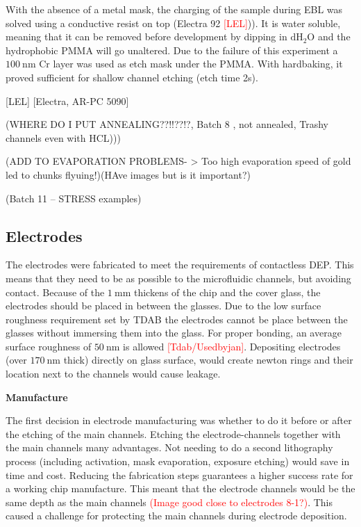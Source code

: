 \documentclass[draft]{jyflluk}
\begin{document}
With the absence of a metal mask, the charging of the sample during EBL was solved using a conductive resist on top (Electra 92 \textcolor{red}{[LEL]})). It is water soluble, meaning that it can be removed before development by dipping in $\mathrm{dH_2O}$ and the hydrophobic PMMA will go unaltered. 
Due to the failure of this experiment a $\SI{100}{\nano \metre}$ Cr layer was used as etch mask under the PMMA. With hardbaking, it proved sufficient for shallow channel etching (etch time 2s).


[LEL] [Electra, AR-PC 5090]

(WHERE DO I PUT ANNEALING??!!??!?,  Batch 8 , not annealed, Trashy channels even with HCL)))

(ADD TO EVAPORATION PROBLEMS- > Too high evaporation speed of gold led to chunks flyuing!)(HAve images but is it important?)

(Batch 11 – STRESS examples)





\subsection{Electrodes}
\label{sec:xxx4}

The electrodes were fabricated to meet the requirements of contactless DEP. This means that they need to be as possible to the microfluidic channels, but avoiding contact. Because of the $\SI{1}{\milli \metre}$ thickens of the chip and the cover glass, the electrodes should be placed in between the glasses. Due to the low surface roughness requirement set by TDAB the electrodes cannot be place between the glasses without immersing them into the glass. For proper bonding, an average surface roughness of $\SI{50}{\nano \metre}$ is allowed \textcolor{red}{[Tdab/Usedbyjan]}. Depositing electrodes (over $\SI{170}{\nano \metre}$ thick) directly on glass surface, would create newton rings and their location next to the channels would cause leakage. 


\textbf{Manufacture}

The first decision in electrode manufacturing was whether to do it before or after the etching of the main channels. Etching the electrode-channels together with the main channels many advantages. Not needing to do a second lithography process (including activation, mask evaporation, exposure etching) would save in time and cost. Reducing the fabrication steps guarantees a higher success rate for a working chip manufacture. This meant that the electrode channels would be the same depth as the main channels \textcolor{red}{(Image good close to electrodes 8-1?)}. This caused a challenge for protecting the main channels during electrode deposition.
\end{document}
